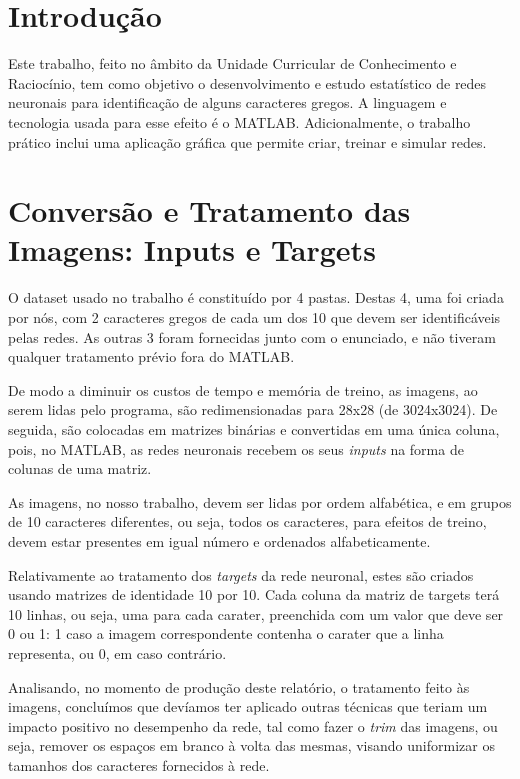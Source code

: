 \documentclass[11pt]{article}
\begin{document}
	
	
	\tableofcontents
	\pagebreak
	
	\large
	\section{Introdução}
	
	\normalsize
	Este trabalho, feito no âmbito da Unidade Curricular de Conhecimento e Raciocínio, tem como objetivo o desenvolvimento e estudo estatístico de redes neuronais para identificação de alguns caracteres gregos. A linguagem e tecnologia usada para esse efeito é o MATLAB. Adicionalmente, o trabalho prático inclui uma aplicação gráfica que permite criar, treinar e simular redes.
	
	\large
	\section{Conversão e Tratamento das Imagens: Inputs e Targets}
	\normalsize
	
	O dataset usado no trabalho é constituído por 4 pastas. Destas 4, uma foi criada por nós, com 2 caracteres gregos de cada um dos 10 que devem ser identificáveis pelas redes. As outras 3 foram fornecidas junto com o enunciado, e não tiveram qualquer tratamento prévio fora do MATLAB.
	
	De modo a diminuir os custos de tempo e memória de treino, as imagens, ao serem lidas pelo programa, são redimensionadas para 28x28 (de 3024x3024). De seguida, são colocadas em matrizes binárias e convertidas em uma única coluna, pois, no MATLAB, as redes neuronais recebem os seus \textit{inputs} na forma de colunas de uma matriz.
	
	As imagens, no nosso trabalho, devem ser lidas por ordem alfabética, e em grupos de 10 caracteres diferentes, ou seja, todos os caracteres, para efeitos de treino, devem estar presentes em igual número e ordenados alfabeticamente.
	
	Relativamente ao tratamento dos \textit{targets} da rede neuronal, estes são criados usando matrizes de identidade 10 por 10. Cada coluna da matriz de targets terá 10 linhas, ou seja, uma para cada carater, preenchida com um valor que deve ser 0 ou 1: 1 caso a imagem correspondente contenha o carater que a linha representa, ou 0, em caso contrário.
	
	Analisando, no momento de produção deste relatório, o tratamento feito às imagens, concluímos que devíamos ter aplicado outras técnicas que teriam um impacto positivo no desempenho da rede, tal como fazer o \textit{trim} das imagens, ou seja, remover os espaços em branco à volta das mesmas, visando uniformizar os tamanhos dos caracteres fornecidos à rede.
\end{document}
